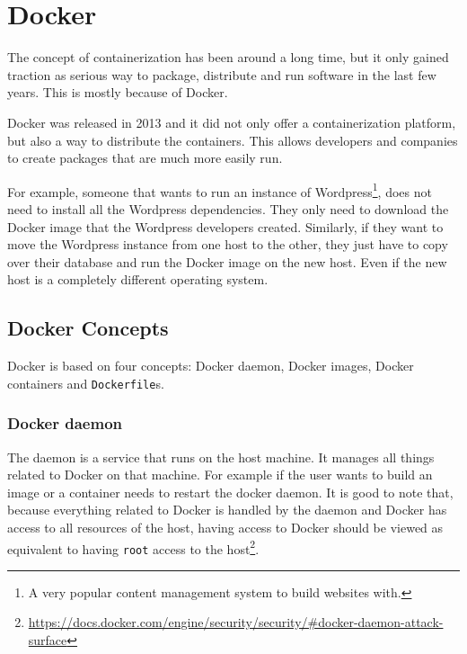 \section{Docker}

\hfill

The concept of containerization has been around a long time, but it only gained traction as serious way to package, distribute and run software in the last few years. This is mostly because of Docker.

\hfill

Docker was released in 2013 and it did not only offer a containerization platform, but also a way to distribute the containers. This allows developers and companies to create packages that are much more easily run.

\hfill

For example, someone that wants to run an instance of Wordpress\footnote{A very popular content management system to build websites with.}, does not need to install all the Wordpress dependencies. They only need to download the Docker image that the Wordpress developers created.
Similarly, if they want to move the Wordpress instance from one host to the other, they just have to copy over their database and run the Docker image on the new host. Even if the new host is a completely different operating system.

\subsection{Docker Concepts}
Docker is based on four concepts: Docker daemon, Docker images, Docker containers and \lstinline{Dockerfile}s.

\subsubsection{Docker daemon}
The daemon is a service that runs on the host machine. It manages all things related to Docker on that machine. For example if the user wants to build an image or a container needs to restart the docker daemon. It is good to note that, because everything related to Docker is handled by the daemon and Docker has access to all resources of the host, having access to Docker should be viewed as equivalent to having \lstinline{root} access to the host\footnote{\url{https://docs.docker.com/engine/security/security/\#docker-daemon-attack-surface}}.

